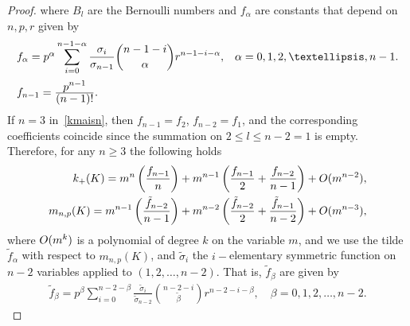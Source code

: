 \documentclass[10pt,a4paper]{amsart}
\newcommand{\bo}{{\rm O}}
\newcommand{\dsum}{\ds\sum}
\newcommand{\ds}{\displaystyle}
\newcommand{\eqskip}{ \vspace*{2mm}\\ }
\newcommand{\fr}[2]{\frac{\ds #1}{\ds #2}}
\begin{document}
\begin{proof}
where $B_l$ are the Bernoulli numbers and    $f_{\alpha}$ are constants that  depend on $n,p,r$  given by
\[\begin{array}{ll}
f_{\alpha}=p^{\alpha}\dsum_{i=0}^{n-1-\alpha}
 \fr{\sigma_i}{\sigma_{n-1}}\binom{n-1-i}{\alpha} r^{n-1-i-\alpha}, & \alpha=0,1,2,  \ldots, n-1.\eqskip
 f_{n-1}=\fr{p^{n-1}}{(n-1)!}.
 \end{array}\]
 If $n=3$ in~\eqref{kmaisn}, then  $f_{n-1}=f_2$, $f_{n-2}=f_1$, and the corresponding coefficients coincide since the summation on $2\leq l\leq n-2=1$ is empty.
 Therefore, for any  $n\geq 3$ the following holds
\begin{eqnarray}\label{kmais2}
k_+(K) =  m^{n}\left(\frac{f_{n-1}}{n}\right) +m^{n-1}\left(\frac{f_{n-1}}{2}+\frac{f_{n-2}}{n-1}\right) +\bo(m^{n-2}),\\
\label{tilde2term}
m_{n,p}(K) = m^{n-1}\left(\frac{\tilde{f}_{n-2}}{n-1}\right) +m^{n-2}\left(\frac{\tilde{f}_{n-2}}{2}+\frac{\tilde{f}_{n-1}}{n-2}\right) +{\bo(m^{n-3})},
\end{eqnarray}
where $\bo(m^{k})$ is a polynomial of degree ${k}$ on the variable $m$, and  we use the tilde $\tilde{f}_{\alpha}$  with respect to
$m_{n,p}(K)$, and 
  $\tilde{\sigma}_i$ the $i-$elementary symmetric function on $n-2$ variables applied to $(1,2, \ldots, n-2)$. That is,  $\tilde{f}_{\beta}$ are given by
\[\begin{array}{l}
\tilde{f}_{\beta}=p^{\beta}\dsum_{i=0}^{n-2-\beta}
 \fr{\tilde{\sigma}_i}{\tilde{\sigma}_{n-2}}\binom{n-2-i}{\tilde{\beta}} r^{n-2-i-\beta}, \quad \beta=0,1, 2, \ldots, n-2.
 \end{array}\]


\end{proof}
\end{document}
